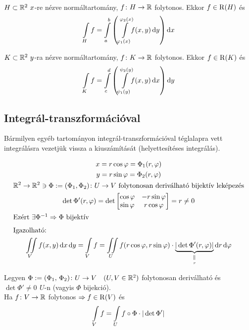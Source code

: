 \begin{te}\ 
  \begin{enumzjb}
    \item $H\subset \mathbb{R}^2\ x$-re nézve normáltartomány, $f\colon H\to\mathbb{R}$  folytonos. Ekkor $f\in\operatorname{R}(H)$ és
      \[\Int_Hf=\Int_a^b\left(\Int_{\vfi_1(x)}^{\vfi_2(x)}\!\!f(x,y)\diff y\right)\diff x\]
    \item $K\subset \mathbb{R}^2\ y$-ra nézve normáltartomány, $f\colon K\to\mathbb{R}$  folytonos. Ekkor $f\in\operatorname{R}(K)$ és
      \[\Int_Kf=\Int_c^d\left(\Int_{\psi_1(y)}^{\psi_2(y)}\!\!f(x,y)\diff x\right)\diff y\]
  \end{enumzjb}
\end{te}

\subsection{Integrál-transzformációval}
Bármilyen egyéb tartományon integrál-transzformációval téglalapra vett integrálásra vezetjük vissza a kiuszámítását
(helyettesítéses integrálás).

\begin{pl}
\begin{gather*}
  x=r\cos\vfi=\Phi_1(r,\vfi)\\
  y=r\sin\vfi=\Phi_2(r,\vfi)\\
  \R^2\to\R^2\owns\Phi:=(\Phi_1,\Phi_2)\colon U\to V\text{ folytonosan deriválható bijektív leképezés}\\
  \det\Phi'(r,\vfi)=\det\begin{bmatrix}\cos\vfi & -r\sin\vfi\\\sin\vfi & r\cos\vfi\end{bmatrix} = r \ne 0\\
  \intertext{Ezért $\exists\Phi^{-1}\nn \Phi$  bijektív}
  \intertext{Igazolható:}
  \iint\limits_Vf(x,y)\diff x\diff y=\Int_V f=\iint\limits_U f(r\cos\vfi,r\sin\vfi)\cdot\underbrace{
  \vert\det\Phi'(r,\vfi)\vert }_{\underset{r}{\scriptsize{\Vert}}}\diff r\diff \vfi  
\end{gather*}
\end{pl}
\begin{te}
  Legyen $\Phi:=(\Phi_1,\,\Phi_2)\colon U\to V\quad (U,V\in\mathbb{R}^2)$ folytonosan deriválható és $\det\Phi' \ne0\ \,U$-n
  (vagyis $\Phi$ bijekció).\\
  Ha  $f\colon V\to\mathbb{R}$ folytonos $\Rightarrow f\in\operatorname{R}(V)$ és
  \[\Int_Vf=\Int_Uf\circ\Phi\cdot\vert\det\Phi'\vert\]
\end{te}

